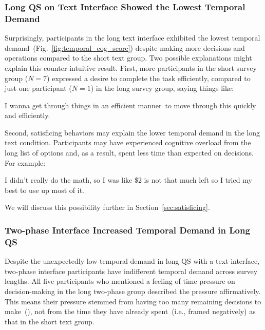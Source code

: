 \subsubsection{Long QS on Text Interface Showed the Lowest Temporal Demand} 
Surprisingly, participants in the long text interface exhibited the lowest temporal demand~(Fig.~\ref{fig:temporal_cog_score}) despite making more decisions and operations compared to the short text group. Two possible explanations might explain this counter-intuitive result. First, more participants in the short survey group ($N=7$) expressed a desire to complete the task efficiently, compared to just one participant ($N=1$) in the long survey group, saying things like:

\begin{displayquote}
I wanna get through things in an efficient manner~\bracketellipsis to move through this quickly and efficiently. \hfill{}
\end{displayquote}

Second, satisficing behaviors may explain the lower temporal demand in the long text condition. Participants may have experienced cognitive overload from the long list of options and, as a result, spent less time than expected on decisions. For example:
\begin{displayquote}
I didn't really do the math, so I was like \$2 is not that much left so I tried my best to use up most of it. \\\hfill{}
\end{displayquote}

We will discuss this possibility further in Section~\ref{sec:satisficing}.

\subsubsection{Two-phase Interface Increased Temporal Demand in Long QS} Despite the unexpectedly low temporal demand in long QS with a text interface, two-phase interface participants have indifferent temporal demand across survey lengths. All five participants who mentioned a feeling of time pressure on decision-making in the long two-phase group described the pressure affirmatively. This means their pressure stemmed from having too many remaining decisions to make~(), not from the time they have already spent~(i.e., framed negatively) as that in the short text group. 

